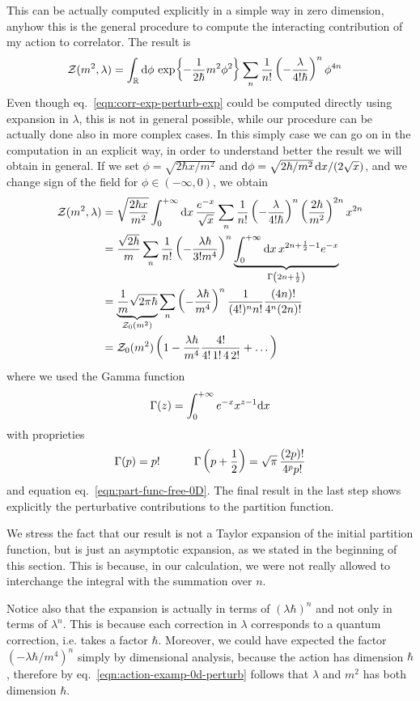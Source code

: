 \documentclass[../main/main.tex]{subfiles}
\begin{document}
This can be actually computed explicitly in a simple way in zero dimension, anyhow this is the general procedure to compute the interacting contribution of my action to correlator. The result is
\begin{align*}
\mathcal Z(m^2,\lambda)
&=\int_{\mathbb{R}}\textup{d}\phi \,\exp{-\frac1{2\hbar}m^2\phi^2}\sum_n\frac1{n!}\left(-\frac\lambda{4!\hbar}\right)^n\phi^{4n}
\end{align*}
Even though eq.~\eqref{eqn:corr-exp-perturb-exp} could be computed directly using expansion in $\lambda$, this is not in general possible, while our procedure can be actually done also in more complex cases. In this simply case we can go on in the computation in an explicit way, in order to understand better the result we will obtain in general. If we set $\phi=\sqrt{2\hbar x/m^2}$ and $\textup{d}\phi=\sqrt{2\hbar/m^2}\,\textup{d} x/(2\sqrt x)$, and we change sign of the field for $\phi\in(-\infty,0)$, we obtain
\begin{align*}
\mathcal Z(m^2,\lambda)
&=\sqrt{\frac{2\hbar x}{m^2}}\int_0^{+\infty}\textup{d} x\,\frac{e^{-x}}{\sqrt x}\sum_n\frac1{n!}\left(-\frac{\lambda}{4!\hbar}\right)^n\left(\frac{2\hbar}{m^2}\right)^{2n}x^{2n}\\
&=\frac{\sqrt{2\hbar}}m\sum_n\frac1{n!}\left(-\frac{\lambda\hbar}{3!m^4}\right)^n\underbrace{\int_0^{+\infty}\textup{d} x\,x^{2n+\frac12-1}e^{-x}}_{\Gamma\left(2n+\frac12\right)}\\
&=\underbrace{\frac1m\sqrt{2\pi\hbar}}_{\mathcal Z_0(m^2)}\sum_n\left(-\frac{\lambda\hbar}{m^4}\right)^n\frac1{(4!)^nn!}\frac{(4n)!}{4^n(2n)!}\\
&=\mathcal Z_0(m^2)\left(1-\frac{\lambda\hbar}{m^4}\frac{4!}{4!\,1!\,4\,2!}+\dots\right)
\end{align*}
where we used the Gamma function
\begin{equation}\label{eqn:Gamma-function}
\Gamma(z)=\int_0^{+\infty}e^{-x}x^{z-1}\textup{d} x
\end{equation}
with proprieties
\[\Gamma(p)=p!\qquad\quad\Gamma\left(p+\frac12\right)=\sqrt\pi\,\frac{(2p)!}{4^pp!}\]
and equation eq.~\eqref{eqn:part-func-free-0D}. The final result in the last step shows explicitly the perturbative contributions to the partition function. 

We stress the fact that our result is not a Taylor expansion of the initial partition function, but is just an asymptotic expansion, as we stated in the beginning of this section. This is because, in our calculation, we were not really allowed to interchange the integral with the summation over $n$. 

Notice also that the expansion is actually in terms of $(\lambda\hbar)^n$ and not only in terms of $\lambda^n$. This is because each correction in $\lambda$ corresponds to a quantum correction, i.e. takes a factor $\hbar$. Moreover, we could have expected the factor $(-\lambda\hbar/m^4)^n$ simply by dimensional analysis, because the action has dimension $\hbar$, therefore by eq.~\eqref{eqn:action-examp-0d-perturb} follows that $\lambda$ and $m^2$ has both dimension $\hbar$.
\end{document}
